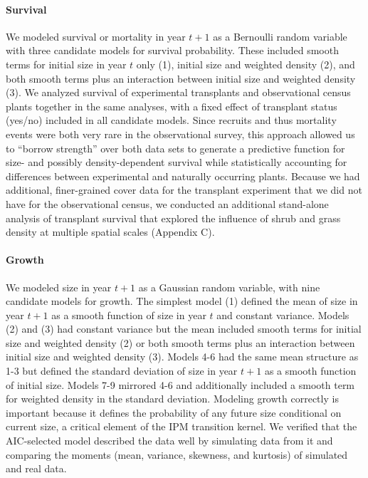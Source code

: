 \documentclass[11pt]{article}\usepackage[]{graphicx}\usepackage[usenames,dvipsnames]{xcolor}
\begin{document}
\paragraph{Survival}
We modeled survival or mortality in year $t+1$ as a Bernoulli random variable with three candidate models for survival probability.
These included smooth terms for initial size in year $t$ only (1), initial size and weighted density (2), and both smooth terms plus an interaction between initial size and weighted density (3). 
We analyzed survival of experimental transplants and observational census plants together in the same analyses, with a fixed effect of transplant status (yes/no) included in all candidate models. 
Since recruits and thus mortality events were both very rare in the observational survey, this approach allowed us to ``borrow strength'' over both data sets to generate a predictive function for size- and possibly density-dependent survival while statistically accounting for differences between experimental and naturally occurring plants. 
Because we had additional, finer-grained cover data for the transplant experiment that we did not have for the observational census, we conducted an additional stand-alone analysis of transplant survival that explored the influence of shrub and grass density at multiple spatial scales (Appendix C).

\paragraph{Growth}
We modeled size in year $t+1$ as a Gaussian random variable, with nine candidate models for growth.
The simplest model (1) defined the mean of size in year $t+1$ as a smooth function of size in year $t$ and constant variance. 
Models (2) and (3) had constant variance but the mean included smooth terms for initial size and weighted density (2) or both smooth terms plus an interaction between initial size and weighted density (3).
Models 4-6 had the same mean structure as 1-3 but defined the standard deviation of size in year $t+1$ as a smooth function of initial size. 
Models 7-9 mirrored 4-6 and additionally included a smooth term for weighted density in the standard deviation. 
Modeling growth correctly is important because it defines the probability of any future size conditional on current size, a critical element of the IPM transition kernel.
We verified that the AIC-selected model described the data well by simulating data from it and comparing the moments (mean, variance, skewness, and kurtosis) of simulated and real data.
\end{document}
